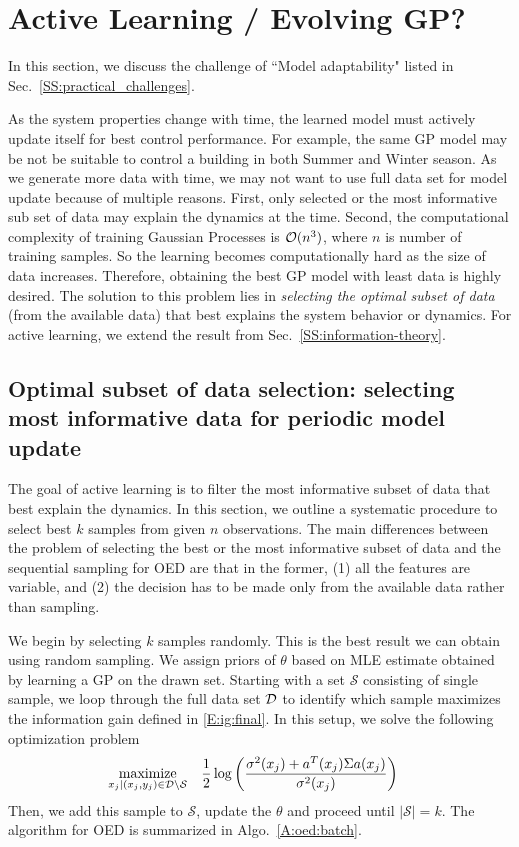 \section{Active Learning / Evolving GP?}
\label{S:active}

In this section, we discuss the challenge of ``Model adaptability" listed in Sec.~\ref{SS:practical_challenges}.

As the system properties change with time, the learned model must actively update itself for best control performance.
For example, the same GP model may be not be suitable to control a building in both Summer and Winter season.
As we generate more data with time, we may not want to use full data set for model update because of multiple reasons.
First, only selected or the most informative sub set of data may explain the dynamics at the time. Second, the computational complexity of training Gaussian Processes is $\mathcal{O}(n^3)$, where $n$ is number of training samples. So the learning becomes computationally hard as the size of data increases.
Therefore, obtaining the best GP model with least data is highly desired. The solution to this problem lies in \textit{selecting the optimal subset of data} (from the available data) that best explains the system behavior or dynamics.
For active learning, we extend the result from Sec.~\ref{SS:information-theory}.

\subsection{Optimal subset of data selection: selecting most informative data for periodic model update}

The goal of active learning is to filter the most informative subset of data that best explain the dynamics.
In this section, we outline a systematic procedure to select best $k$ samples from given $n$ observations.
The main differences between the problem of selecting the best or the most informative subset of data and the sequential sampling for OED are that in the former, (1) all the features are variable, and (2) the decision has to be made only from the available data rather than sampling. 

We begin by selecting \(k\) samples randomly. This is the best result we can obtain using random sampling. We assign priors of \(\theta\) based on MLE estimate obtained by learning a GP on the drawn set.
Starting with a set \(\mathcal{S}\) consisting of single sample, we loop through the full data set \(\mathcal{D}\) to identify which sample maximizes the information gain defined in \eqref{E:ig:final}. In this setup, we solve the following optimization problem
\begin{align}
\label{E:oed:batch}
\maximize_{x_{j}|(x_j,y_j) \in \mathcal{D} \setminus \mathcal{S}} & \ \ \ \frac{1}{2}\log\left(\frac{\sigma^2(x_j)+a^T(x_j)\Sigma a(x_j)}{\sigma^2(x_j)}\right)
\end{align}
Then, we add this sample to \(\mathcal{S}\), update the \(\theta\)  and proceed until \(|\mathcal{S}|=k\).
The algorithm for OED is summarized in Algo.~\ref{A:oed:batch}.

